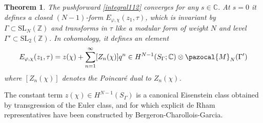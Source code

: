 \documentclass[a4paper,11pt]{amsart} %
\newcommand{\8}{\infty}
\newcommand{\Z}{\mathbb{Z}}
\newcommand{\SL}{\mathrm{SL}}
\newcommand{\C}{\mathbb{C}}
\newcommand{\Mcal}{\pazocal{M}}
\theoremstyle{mytheoremstyle}
\newtheorem{thm}{Theorem}[section]
\theoremstyle{remark}
\numberwithin{equation}{section}
\begin{document}
\begin{thm} \label{theoremA} The pushforward \eqref{integral112} converges for any $s \in \C$. At $s=0$ it defines a closed $(N-1)$-form $E_{\varphi, \chi}(z_1,\tau)$, which is invariant by $\Gamma \subset \SL_N(\Z)$ and transforms in $\tau$ like a modular form of weight $N$ and level $\Gamma' \subset \SL_2(\Z)$. In cohomology, it defines an element
\begin{align}
E_{\varphi, \chi}(z_1,\tau) = z(\chi)+\sum_{n=1}^\8 [Z_n(\chi)] q^n \in H^{N-1}(S_\Gamma;\C)\otimes \Mcal_N(\Gamma')
\end{align}
where $[Z_n(\chi)]$ denotes the Poincaré dual to $Z_n(\chi)$.
\end{thm}
The constant term $z(\chi) \in H^{N-1}(S_\Gamma)$ is a canonical Eisenstein class obtained by transgression of the Euler class, and for which explicit de Rham representatives have been constructed by Bergeron-Charollois-Garcia.
\end{document}
